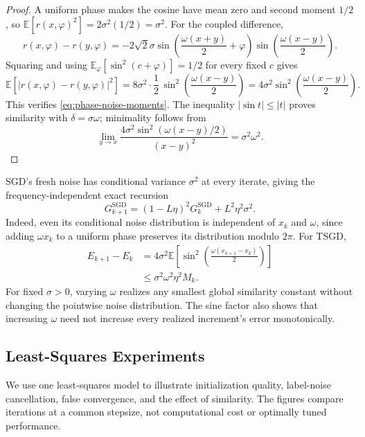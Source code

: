 \begin{proof}
A uniform phase makes the cosine have mean zero and second moment
$1/2$, so
$\mathbb E[r(x,\varphi)^2]=2\sigma^2(1/2)=\sigma^2$.
For the coupled difference,
\[
r(x,\varphi)-r(y,\varphi)
=-2\sqrt2\sigma
\sin\!\left(\frac{\omega(x+y)}2+\varphi\right)
\sin\!\left(\frac{\omega(x-y)}2\right).
\]
Squaring and using
$\mathbb E_\varphi[\sin^2(c+\varphi)]=1/2$ for every fixed $c$ gives
\[
\mathbb E[|r(x,\varphi)-r(y,\varphi)|^2]
=8\sigma^2\cdot\frac12\,
  \sin^2\!\left(\frac{\omega(x-y)}2\right)
=4\sigma^2\sin^2\!\left(\frac{\omega(x-y)}2\right).
\]
This verifies \eqref{eq:phase-noise-moments}.
The inequality $|\sin t|\leq|t|$ proves similarity with
$\delta=\sigma\omega$; minimality follows from
\[
\lim_{y\to x}
\frac{4\sigma^2\sin^2(\omega(x-y)/2)}{(x-y)^2}
=\sigma^2\omega^2.
\]
\end{proof}

SGD's fresh noise has conditional variance $\sigma^2$ at every
iterate, giving the frequency-independent exact recursion
\begin{equation}
\label{eq:phase-sgd-dynamics}
G_{k+1}^{\mathrm{SGD}}
=(1-L\eta)^2G_k^{\mathrm{SGD}}+L^2\eta^2\sigma^2.
\end{equation}
Indeed, even its conditional noise distribution is independent of
$x_k$ and $\omega$, since adding $\omega x_k$ to a uniform phase
preserves its distribution modulo $2\pi$. For TSGD,
\begin{equation}
\label{eq:phase-tsgd-error}
\begin{aligned}
E_{k+1}-E_k
&=4\sigma^2\mathbb E\!\left[
\sin^2\!\left(\frac{\omega(x_{k+1}-x_k)}2\right)\right]\\
&\leq\sigma^2\omega^2\eta^2M_k.
\end{aligned}
\end{equation}
For fixed $\sigma>0$, varying $\omega$ realizes any smallest global
similarity constant without changing the pointwise noise distribution.
The sine factor also shows that
increasing $\omega$ need not increase every realized increment's
error monotonically.

\subsection{Least-Squares Experiments}
\label{app:ls}

We use one least-squares model to illustrate initialization quality,
label-noise cancellation, false convergence, and the effect of similarity.
The figures compare iterations at a common stepsize, not computational
cost or optimally tuned performance.

